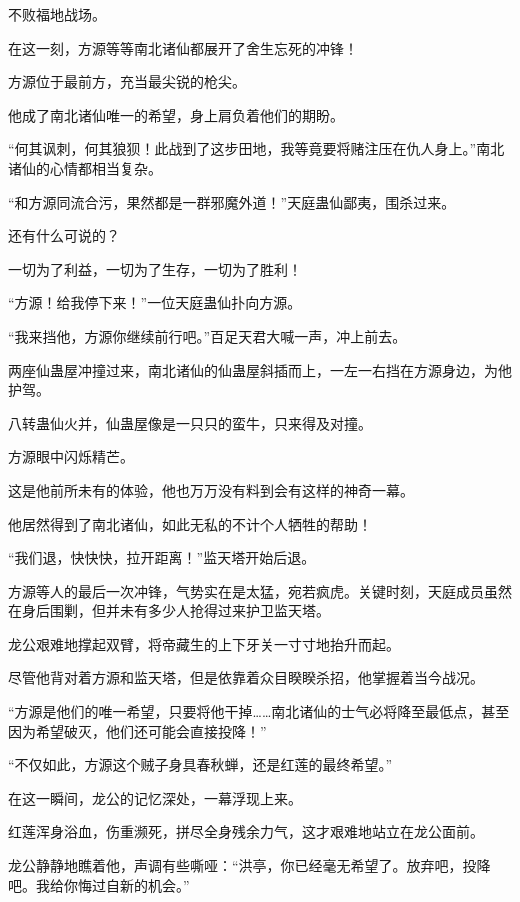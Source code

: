 
\begin{this_body}



不败福地战场。

在这一刻，方源等等南北诸仙都展开了舍生忘死的冲锋！

方源位于最前方，充当最尖锐的枪尖。

他成了南北诸仙唯一的希望，身上肩负着他们的期盼。

“何其讽刺，何其狼狈！此战到了这步田地，我等竟要将赌注压在仇人身上。”南北诸仙的心情都相当复杂。

“和方源同流合污，果然都是一群邪魔外道！”天庭蛊仙鄙夷，围杀过来。

还有什么可说的？

一切为了利益，一切为了生存，一切为了胜利！

“方源！给我停下来！”一位天庭蛊仙扑向方源。

“我来挡他，方源你继续前行吧。”百足天君大喊一声，冲上前去。

两座仙蛊屋冲撞过来，南北诸仙的仙蛊屋斜插而上，一左一右挡在方源身边，为他护驾。

八转蛊仙火并，仙蛊屋像是一只只的蛮牛，只来得及对撞。

方源眼中闪烁精芒。

这是他前所未有的体验，他也万万没有料到会有这样的神奇一幕。

他居然得到了南北诸仙，如此无私的不计个人牺牲的帮助！

“我们退，快快快，拉开距离！”监天塔开始后退。

方源等人的最后一次冲锋，气势实在是太猛，宛若疯虎。关键时刻，天庭成员虽然在身后围剿，但并未有多少人抢得过来护卫监天塔。

龙公艰难地撑起双臂，将帝藏生的上下牙关一寸寸地抬升而起。

尽管他背对着方源和监天塔，但是依靠着众目睽睽杀招，他掌握着当今战况。

“方源是他们的唯一希望，只要将他干掉……南北诸仙的士气必将降至最低点，甚至因为希望破灭，他们还可能会直接投降！”

“不仅如此，方源这个贼子身具春秋蝉，还是红莲的最终希望。”

在这一瞬间，龙公的记忆深处，一幕浮现上来。

红莲浑身浴血，伤重濒死，拼尽全身残余力气，这才艰难地站立在龙公面前。

龙公静静地瞧着他，声调有些嘶哑：“洪亭，你已经毫无希望了。放弃吧，投降吧。我给你悔过自新的机会。”


\end{this_body}
